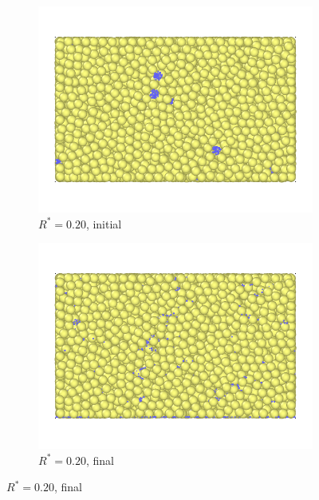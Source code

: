 \begin{figure}[!ht]
	\centering
	\begin{subfigure}[b]{\imagewidth}
		\centering
		\includegraphics[width=\textwidth]{chapters/figures/crush-fragments/0.20-1.png}
		\caption{$R^* = 0.20$, initial}
	\end{subfigure}
	\begin{subfigure}[b]{\imagewidth}
		\centering
		\includegraphics[width=\textwidth]{chapters/figures/crush-fragments/0.20-2.png}
		\caption{$R^* = 0.20$, final}
	\end{subfigure}
	

\end{figure}
